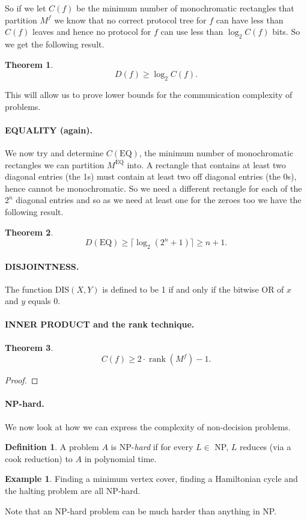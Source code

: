\documentclass[11pt,a4paper]{article}
\theoremstyle{definition}
\newtheorem{thm}{Theorem}
\newtheorem{defn}{Definition}
\newtheorem*{ex}{Example}
\begin{document}
So if we let $C(f)$ be the minimum number of monochromatic rectangles that partition $M^f$ we know that no correct protocol tree for $f$ can have less than $C(f)$ leaves and hence no protocol for $f$ can use less than $\log_2 C(f)$ bits.
So we get the following result.
\begin{thm}
\[
D(f) \ge \log_2 C(f).
\]
\end{thm}
This will allow us to prove lower bounds for the communication complexity of problems.

\paragraph{EQUALITY (again).}
We now try and determine $C(\text{EQ})$, the minimum number of monochromatic rectangles we can partition $M^\text{EQ}$ into.
A rectangle that contains at least two diagonal entries (the 1s) must contain at least two off diagonal entries (the 0s), hence cannot be monochromatic.
So we need a different rectangle for each of the $2^n$ diagonal entries and so as we need at least one for the zeroes too we have the following result.
\begin{thm}
\[
D(\text{EQ}) \ge \lceil \log_2(2^n + 1) \rceil \ge n+1.
\]
\end{thm}

\paragraph{DISJOINTNESS.}
The function $\text{DIS}(X,Y)$ is defined to be 1 if and only if the bitwise OR of $x$ and $y$ equals 0.

\paragraph{INNER PRODUCT and the rank technique.}

\begin{thm}
\[
C(f) \ge 2\cdot \operatorname{rank}(M^f) - 1.
\]
\end{thm}
\begin{proof}

\end{proof}

\paragraph{NP-hard.}
We now look at how we can express the complexity of non-decision problems.
\begin{defn}
A problem $A$ is NP-\emph{hard} if for every $L\in$ NP, $L$ reduces (via a cook reduction) to $A$ in polynomial time.
\end{defn}
\begin{ex}
Finding a minimum vertex cover, finding a Hamiltonian cycle and the halting problem are all NP-hard.
\end{ex}
Note that an NP-hard problem can be much harder than anything in NP.
\end{document}
